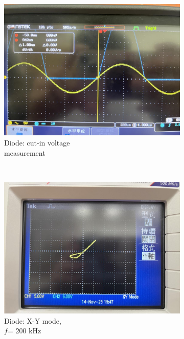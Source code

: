 \documentclass{article}
\begin{document}
\begin{CJK*}{UTF8}{bkai}
\begin{figure}[h]
\begin{center}
        \begin{subfigure}[b]{0.3\textwidth}
            \includegraphics[width=\textwidth]{cut_in_voltage.jpg}
            \caption{Diode: cut-in voltage \\measurement}
        \end{subfigure}
        ~
        \begin{subfigure}[b]{0.3\textwidth}
            \includegraphics[width=\textwidth]{diode_200k.jpg}
            \caption{Diode: X-Y mode,\\ $f$= 200 k\unit{\hertz}}
        \end{subfigure}
        ~
        \begin{subfigure}[b]{0.3\textwidth}

\end{subfigure}
\end{center}
\end{figure}
\end{CJK*}
\end{document}
